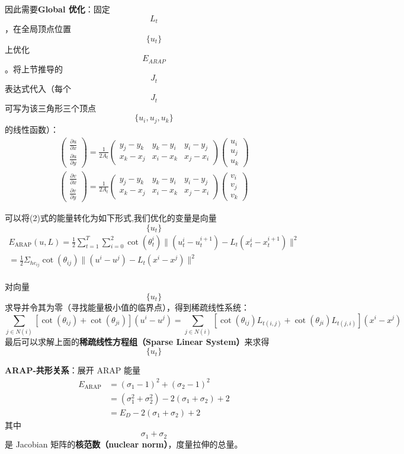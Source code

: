 \documentclass[
]{article}
\begin{document}
因此需要\textbf{Global 优化}：固定 \[L_t\]，在全局顶点位置 \[\{u_t\}\]
上优化 \[E_{ARAP}\]。将上节推导的 \[J_t\] 表达式代入（每个 \[J_t\]
可写为该三角形三个顶点 \[\{u_i, u_j, u_k\}\] 的线性函数）： \[
\begin{aligned}
{\begin{pmatrix}{\frac{\partial u}{\partial x}}\\{\frac{\partial u}{\partial y}}\end{pmatrix} }=\frac{1}{2A_t}{\begin{pmatrix}{y_j-y_k}&{y_k-y_i}&{y_i-y_j}\\{x_k-x_j}&{x_i-x_k}&{x_j-x_i}\end{pmatrix} }
{\begin{pmatrix}u_i\\u_j\\u_k\end{pmatrix} }\\
{\begin{pmatrix}{\frac{\partial v}{\partial x}}\\{\frac{\partial v}{\partial y}}\end{pmatrix} }=\frac{1}{2A_t}{\begin{pmatrix}{y_j-y_k}&{y_k-y_i}&{y_i-y_j}\\{x_k-x_j}&{x_i-x_k}&{x_j-x_i}\end{pmatrix} }
{\begin{pmatrix}v_i\\v_j\\v_k\end{pmatrix} }
\end{aligned}
\]

可以将(2)式的能量转化为如下形式,我们优化的变量是向量\[\{u_t\}\] \[
\begin{aligned}
E_{\text{ARAP}}(u,L) = \frac{1}{2}\sum_{t=1}^T\sum_{i=0}^2\cot(\theta_t^i)\|(u_t^i-u_t^{i+1})-L_t(x_t^i-x_t^{i+1})\|^2\\
=\frac{1}{2} \Sigma_{he_{ij}}\cot(\theta_{ij})\|(u^i-u^j)-L_t(x^i-x^j)\|^2\\
\end{aligned}
\tag{8}
\]

对向量 \[\{u_t\}\]
求导并令其为零（寻找能量极小值的临界点），得到稀疏线性系统： \[
\sum_{j\in N(i)}[\cot(\theta_{ij}) +\cot(\theta_{ji})](u^i-u^{j}) 
=\sum_{j\in N(i)}[\cot(\theta_{ij})L_{t(i,j)} +\cot(\theta_{ji})L_{t(j,i)}](x^i-x^{j}) 
\tag{9}
\] 最后可以求解上面的\textbf{稀疏线性方程组（Sparse Linear
System）}来求得\[\{u_t\}\]

\textbf{ARAP-共形关系}：展开 ARAP 能量 \[
\begin{aligned}
E_{\text{ARAP}} &= (\sigma_1-1)^2 + (\sigma_2-1)^2 \\
&= (\sigma_1^2 + \sigma_2^2) - 2(\sigma_1+\sigma_2) + 2 \\
&= E_D - 2(\sigma_1+\sigma_2) + 2
\end{aligned}
\tag{4}
\] 其中 \[\sigma_1+\sigma_2\] 是 Jacobian 矩阵的\textbf{核范数（nuclear
norm）}，度量拉伸的总量。
\end{document}
